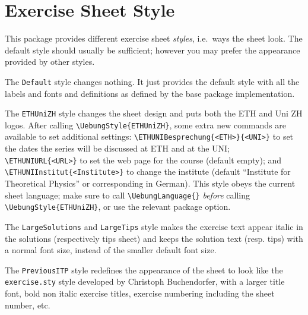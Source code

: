 \documentclass[11pt,a4paper]{article}
\begin{document}


\section{Exercise Sheet Style}
\label{sec:styles}

This package provides different exercise sheet \emph{styles}, i.e.\ ways the sheet
look. The default style should usually be sufficient; however you may prefer the
appearance provided by other styles.


The \texttt{Default} style changes nothing. It just provides the default style with all
the labels and fonts and definitions as defined by the base package implementation.

The \texttt{ETHUniZH} style changes the sheet design and puts both the ETH and Uni ZH
logos. After calling \verb|\UebungStyle{ETHUniZH}|, some extra new commands are available
to set additional settings: \verb|\ETHUNIBesprechung{<ETH>}{<UNI>}| to set the dates the
series will be discussed at ETH and at the UNI; \verb|\ETHUNIURL{<URL>}| to set the web
page for the course (default empty); and \verb|\ETHUNIInstitut{<Institute>}| to change the
institute (default ``Institute for Theoretical Physics'' or corresponding in German). This
style obeys the current sheet language; make sure to call \verb|\UebungLanguage{}|
\emph{before} calling \verb|\UebungStyle{ETHUniZH}|, or use the relevant package option.

The \texttt{LargeSolutions} and \texttt{LargeTips} style makes the exercise text appear
italic in the solutions (respectively tips sheet) and keeps the solution text (resp. tips)
with a normal font size, instead of the smaller default font size.

The \texttt{PreviousITP} style redefines the appearance of the sheet to look like the
\texttt{exercise.sty} style developed by Christoph Buchendorfer, with a larger title font,
bold non italic exercise titles, exercise numbering including the sheet number, etc.
\end{document}
